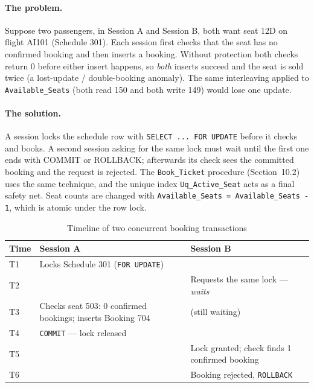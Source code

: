 \documentclass[12pt,a4paper]{article}
\begin{document}
\paragraph{The problem.} Suppose two passengers, in Session A and Session B, both want seat 12D on flight
AI101 (Schedule 301). Each session first checks that the seat has no confirmed booking and then inserts a
booking. Without protection both checks return 0 before either insert happens, so \emph{both} inserts
succeed and the seat is sold twice (a lost-update / double-booking anomaly). The same interleaving applied
to \texttt{Available\_Seats} (both read 150 and both write 149) would lose one update.

\paragraph{The solution.} A session locks the schedule row with \texttt{SELECT ... FOR UPDATE} before it
checks and books. A second session asking for the same lock must wait until the first one ends with COMMIT
or ROLLBACK; afterwards its check sees the committed booking and the request is rejected. The
\texttt{Book\_Ticket} procedure (Section~10.2) uses the same technique, and the unique index
\texttt{Uq\_Active\_Seat} acts as a final safety net. Seat counts are changed with
\texttt{Available\_Seats = Available\_Seats - 1}, which is atomic under the row lock.
\begin{table}[H]
\centering\small
\begin{tabularx}{\textwidth}{l X X}
\toprule
\textbf{Time} & \textbf{Session A} & \textbf{Session B}\\
\midrule
T1 & Locks Schedule 301 (\texttt{FOR UPDATE}) & \\
T2 &  & Requests the same lock --- \emph{waits}\\
T3 & Checks seat 503: 0 confirmed bookings; inserts Booking 704 & (still waiting)\\
T4 & \texttt{COMMIT} --- lock released & \\
T5 &  & Lock granted; check finds 1 confirmed booking\\
T6 &  & Booking rejected, \texttt{ROLLBACK}\\
\bottomrule
\end{tabularx}
\caption{Timeline of two concurrent booking transactions}
\end{table}
\end{document}
